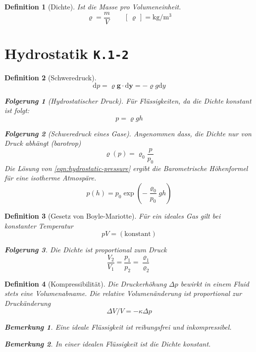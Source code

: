 \documentclass[a4paper, twocolumn]{article}
\numberwithin{equation}{section}
\theoremstyle{hsr-def}
\newtheorem{definition}{Definition}[section]
\theoremstyle{hsr-sub}
\newtheorem{result}{Folgerung}[definition]
\newtheorem{remark}{Bemerkung}[definition]
\newcommand{\dd}[1]{\ensuremath{\mathrm{d}#1}}
\renewcommand{\vec}[1]{\ensuremath{\mathbf{#1}}}
\newcommand{\unitof}[1]{\ensuremath{\left[\,#1\,\right]}}
\newcommand{\fromlecture}[1]{\textcolor{red!70!black}{\small\texttt{K.#1}}}
\begin{document}
\begin{definition}[Dichte] Ist die Masse pro Volumeneinheit.
\[
    \varrho = \frac{m}{V} \qquad \unitof{\varrho} = \si{\kilo\gram\per\cubic\metre}
\]
\end{definition}

\section{Hydrostatik \fromlecture{1-2}}

\begin{definition}[Schweredruck]
\begin{equation} \label{eqn:hydrostatic-pressure}
    \dd{p} = \varrho \vec{g} \cdot \dd{\vec{y}} = - \varrho g \dd{y}
\end{equation}

\begin{result}[Hydrostatischer Druck]
F\"ur Fl\"ussigkeiten, da die Dichte konstant ist folgt:
\[
    p = \varrho g h
\]
\end{result}

\begin{result}[Schweredruck eines Gase]
Angenommen dass, die Dichte nur von Druck abh\"angt (barotrop)
\[
    \varrho(p) = \varrho_0 \frac{p}{p_0}
\]
Die L\"osung von \eqref{eqn:hydrostatic-pressure} ergibt die \emph{Barometrische H\"ohenformel} f\"ur eine isotherme Atmosp\"are.
\[
    p(h) = p_0 \exp\left(-\frac{\varrho_0}{p_0} gh\right)
\]
\end{result}
\end{definition}

\begin{definition}[Gesetz von Boyle-Mariotte]
F\"ur ein ideales Gas gilt bei konstanter Temperatur
\[
    pV = (\text{konstant})
\]

\begin{result}
Die Dichte ist proportional zum Druck
\[
    \frac{V_2}{V_1} = \frac{p_1}{p_2} = \frac{\varrho_1}{\varrho_2}
\]
\end{result}
\end{definition}


\begin{definition}[Kompressibilit\"at]
Die Druckerh\"ohung \(\Delta p\) bewirkt in einem Fluid stets eine Volumenabname.
Die relative Volumen\"anderung ist proportional zur Druck\"anderung
\[
    \Delta V / V = - \kappa \Delta p
\]

\begin{remark}
    Eine ideale Fl\"ussigkeit ist reibungsfrei und inkompressibel.
\end{remark}

\begin{remark}
    In einer idealen Fl\"ussigkeit ist die Dichte konstant.
\end{remark}
\end{definition}
\end{document}
